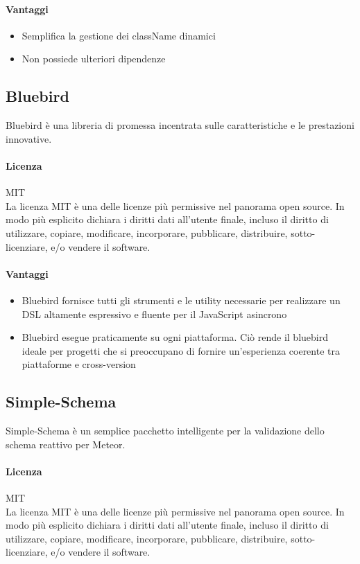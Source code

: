 \paragraph{Vantaggi}
\begin{itemize}
	\item Semplifica la gestione dei className dinamici 
	\item Non possiede ulteriori dipendenze 
\end{itemize}


\subsection{Bluebird}
Bluebird è una libreria di promessa incentrata sulle caratteristiche e le prestazioni innovative.

\paragraph{Licenza} MIT \\
La licenza MIT è una delle licenze più permissive nel panorama open
source. In modo più esplicito dichiara i diritti dati all'utente
finale, incluso il diritto di utilizzare, copiare, modificare,
incorporare, pubblicare, distribuire, sotto-licenziare, e/o vendere il
software. 
\\

\paragraph{Vantaggi}
\begin{itemize}
\item Bluebird fornisce tutti gli strumenti e le utility necessarie per realizzare un DSL altamente espressivo e fluente per il JavaScript asincrono
\item Bluebird esegue praticamente su ogni piattaforma. Ciò rende il bluebird ideale per progetti che si preoccupano di fornire un'esperienza coerente tra piattaforme e cross-version
\end{itemize}


\subsection{Simple-Schema}
Simple-Schema è un semplice pacchetto intelligente per la validazione dello schema reattivo per Meteor.

\paragraph{Licenza} MIT \\
La licenza MIT è una delle licenze più permissive nel panorama open
source. In modo più esplicito dichiara i diritti dati all'utente
finale, incluso il diritto di utilizzare, copiare, modificare,
incorporare, pubblicare, distribuire, sotto-licenziare, e/o vendere il
software. 
\\



